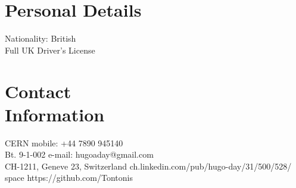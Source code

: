 \documentclass[margin,line]{resume}
\begin{document}
\begin{resume}

    \section{\mysidestyle Personal Details}
    Nationality: British \vspace{0mm}\\\vspace{-4.5mm}%
    Full UK Driver's License  \vspace{0mm}\\\vspace{-4.5mm}%


    \section{\mysidestyle Contact\\Information}
    CERN                            \hfill mobile: +44 7890 945140          \vspace{0mm}\\\vspace{0mm}%
    Bt. 9-1-002                          \hfill e-mail: hugoaday@gmail.com  \vspace{0mm}\\\vspace{-4.5mm} %
    CH-1211, Geneve 23, Switzerland      \hfill ch.linkedin.com/pub/hugo-day/31/500/528/  \vspace{0mm}\\\vspace{-4.5mm}%
   space	    \hfill https://github.com/Tontonis  \vspace{0mm}\\\vspace{-4.5mm}%

%


\end{resume}
\end{document}
